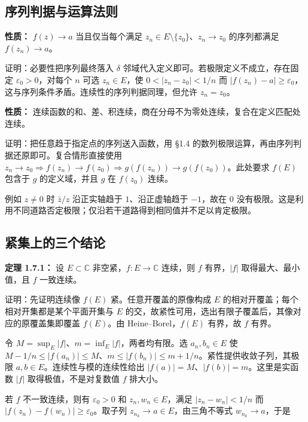 \documentclass[11pt,a4paper]{article}
\begin{document}
\subsection{序列判据与运算法则}\label{ux5e8fux5217ux5224ux636eux4e0eux8fd0ux7b97ux6cd5ux5219}

\textbf{性质：} \(f(z)\to a\) 当且仅当每个满足
\(z_n\in E\setminus\{z_0\}\)、\(z_n\to z_0\) 的序列都满足
\(f(z_n)\to a\)。

证明：必要性把序列最终落入 \(\delta\)
邻域代入定义即可。若极限定义不成立，存在固定 \(\varepsilon_0>0\)，对每个
\(n\) 可选 \(z_n\in E\)，使 \(0<|z_n-z_0|<1/n\) 而
\(|f(z_n)-a|\ge\varepsilon_0\)，这与序列条件矛盾。连续性的序列判据同理，但允许
\(z_n=z_0\)。

\textbf{性质：}
连续函数的和、差、积连续，商在分母不为零处连续，复合在定义匹配处连续。

证明：把任意趋于指定点的序列送入函数，用 §1.4
的数列极限运算，再由序列判据还原即可。复合情形直接使用
\(z_n\to z_0\Rightarrow f(z_n)\to f(z_0)\Rightarrow g(f(z_n))\to g(f(z_0))\)。此处要求
\(f(E)\) 包含于 \(g\) 的定义域，并且 \(g\) 在 \(f(z_0)\) 连续。

例如 \(z\ne0\) 时 \(\bar z/z\) 沿正实轴趋于 \(1\)、沿正虚轴趋于
\(-1\)，故在 \(0\)
没有极限。这是利用不同道路否定极限；仅沿若干道路得到相同值并不足以肯定极限。

\subsection{紧集上的三个结论}\label{ux7d27ux96c6ux4e0aux7684ux4e09ux4e2aux7ed3ux8bba}

\textbf{定理 1.7.1：} 设 \(E\subset\mathbb C\)
非空紧，\(f:E\to\mathbb C\) 连续，则 \(f\) 有界，\(|f|\)
取得最大、最小值，且 \(f\) 一致连续。

证明：先证明连续像 \(f(E)\) 紧。任意开覆盖的原像构成 \(E\)
的相对开覆盖；每个相对开集都是某个平面开集与 \(E\)
的交，故紧性可用，选出有限子覆盖后，其像对应的原覆盖集即覆盖
\(f(E)\)。由 Heine--Borel，\(f(E)\) 有界，故 \(f\) 有界。

令 \(M=\sup_E|f|\)、\(m=\inf_E|f|\)，两者均有限。选 \(a_n,b_n\in E\) 使
\(M-1/n\le|f(a_n)|\le M\)、\(m\le|f(b_n)|\le m+1/n\)。紧性提供收敛子列，其极限
\(a,b\in E\)。连续性与模的连续性给出
\(|f(a)|=M\)、\(|f(b)|=m\)。这里是实函数 \(|f|\) 取得极值，不是对复数值
\(f\) 排大小。

若 \(f\) 不一致连续，则有 \(\varepsilon_0>0\) 和 \(z_n,w_n\in E\)，满足
\(|z_n-w_n|<1/n\) 而 \(|f(z_n)-f(w_n)|\ge\varepsilon_0\)。取子列
\(z_{n_k}\to a\in E\)，由三角不等式 \(w_{n_k}\to a\)，于是
\end{document}
